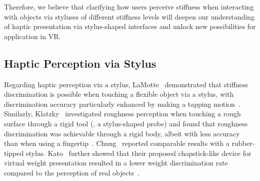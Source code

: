 Therefore, we believe that clarifying how users perceive stiffness when interacting with objects via styluses of different stiffness levels will deepen our understanding of haptic presentation via stylus-shaped interfaces and unlock new possibilities for application in VR.

\subsection{Haptic Perception via Stylus}
\label{2_2}

Regarding haptic perception via a stylus, LaMotte \etal\ demonstrated that stiffness discrimination is possible when touching a flexible object via a stylus, with discrimination accuracy particularly enhanced by making a tapping motion~\cite{Softness_Discrimination}. 
Similarly, Klatzky \etal\ investigated roughness perception when touching a rough surface through a rigid tool (\eg, a stylus-shaped probe) and found that roughness discrimination was achievable through a rigid body, albeit with less accuracy than when using a fingertip~\cite{klatzky1999tactile}. 
Chung \etal\ reported comparable results with a rubber-tipped stylus. 
Kato \etal\ further showed that their proposed chopstick-like device for virtual weight presentation resulted in a lower weight discrimination rate compared to the perception of real objects~\cite{Kato}.

